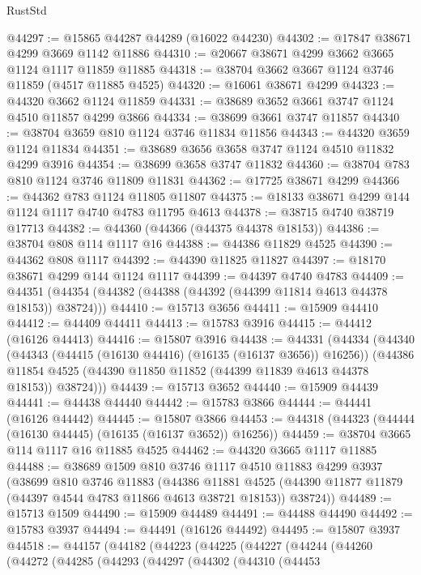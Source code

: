 \begin{lexlean}{RustStd}
\begin{coremodule}
@44297 := @15865 @44287 @44289 (@16022 @44230)
@44302 := @17847 @38671 @4299 @3669 @1142 @11886
@44310 := @20667 @38671 @4299 @3662 @3665 @1124 @1117 @11859 @11885
@44318 := @38704 @3662 @3667 @1124 @3746 @11859 (@4517 @11885 @4525)
@44320 := @16061 @38671 @4299
@44323 := @44320 @3662 @1124 @11859
@44331 := @38689 @3652 @3661 @3747 @1124 @4510 @11857 @4299 @3866
@44334 := @38699 @3661 @3747 @11857
@44340 := @38704 @3659 @810 @1124 @3746 @11834 @11856
@44343 := @44320 @3659 @1124 @11834
@44351 := @38689 @3656 @3658 @3747 @1124 @4510 @11832 @4299 @3916
@44354 := @38699 @3658 @3747 @11832
@44360 := @38704 @783 @810 @1124 @3746 @11809 @11831
@44362 := @17725 @38671 @4299
@44366 := @44362 @783 @1124 @11805 @11807
@44375 := @18133 @38671 @4299 @144 @1124 @1117 @4740 @4783 @11795 @4613
@44378 := @38715 @4740 @38719 @17713
@44382 := @44360 (@44366 (@44375 @44378 @18153))
@44386 := @38704 @808 @114 @1117 @16
@44388 := @44386 @11829 @4525
@44390 := @44362 @808 @1117
@44392 := @44390 @11825 @11827
@44397 := @18170 @38671 @4299 @144 @1124 @1117
@44399 := @44397 @4740 @4783
@44409 := @44351 (@44354 (@44382 (@44388 (@44392 (@44399 @11814 @4613 @44378 @18153)) @38724)))
@44410 := @15713 @3656
@44411 := @15909 @44410
@44412 := @44409 @44411
@44413 := @15783 @3916
@44415 := @44412 (@16126 @44413)
@44416 := @15807 @3916
@44438 := @44331
    (@44334
      (@44340
        (@44343 (@44415 (@16130 @44416) (@16135 (@16137 @3656)) @16256))
        (@44386 @11854 @4525 (@44390 @11850 @11852 (@44399 @11839 @4613 @44378 @18153)) @38724)))
@44439 := @15713 @3652
@44440 := @15909 @44439
@44441 := @44438 @44440
@44442 := @15783 @3866
@44444 := @44441 (@16126 @44442)
@44445 := @15807 @3866
@44453 := @44318 (@44323 (@44444 (@16130 @44445) (@16135 (@16137 @3652)) @16256))
@44459 := @38704 @3665 @114 @1117 @16 @11885 @4525
@44462 := @44320 @3665 @1117 @11885
@44488 := @38689
    @1509
    @810
    @3746
    @1117
    @4510
    @11883
    @4299
    @3937
    (@38699
      @810
      @3746
      @11883
      (@44386
        @11881
        @4525
        (@44390 @11877 @11879 (@44397 @4544 @4783 @11866 @4613 @38721 @18153))
        @38724))
@44489 := @15713 @1509
@44490 := @15909 @44489
@44491 := @44488 @44490
@44492 := @15783 @3937
@44494 := @44491 (@16126 @44492)
@44495 := @15807 @3937
@44518 := @44157
    (@44182
      (@44223
        (@44225
          (@44227
            (@44244
              (@44260
                (@44272
                  (@44285
                    (@44293
                      (@44297
                        (@44302
                          (@44310
                            (@44453

\end{coremodule}
\end{lexlean}
